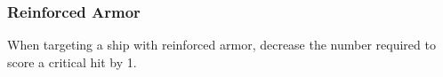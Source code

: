 \subsubsection{Reinforced Armor}
When targeting a ship with reinforced armor, decrease the number required to score a critical hit by 1.